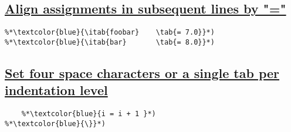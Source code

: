 \documentclass{article}
\begin{document}
\subsection{\label{align-assign}\hyperref[align-assign-ini]{Align assignments in subsequent lines by "="}}
\newcommand{\itab}[1]{\hspace{0em}\rlap{#1}}
\newcommand{\tab}[1]{\hspace{.1\textwidth}\rlap{#1}}
\begin{lstlisting}[frame=single]
%*\textcolor{blue}{\itab{foo}  \tab{= 5.0}}*)
%*\textcolor{blue}{\itab{foobar} 	\tab{= 7.0}}*)
%*\textcolor{blue}{\itab{bar} 		\tab{= 8.0}}*)
\end{lstlisting}

\subsection{\label{indentation}\hyperref[indentation-ini]{Set four space characters or a single tab per indentation level}}
\begin{lstlisting}[frame=single]
%*\textcolor{blue}{while (i \textless n)\{}*)
    %*\textcolor{blue}{i = i + 1 }*)
%*\textcolor{blue}{\}}*)
\end{lstlisting}
\end{document}

